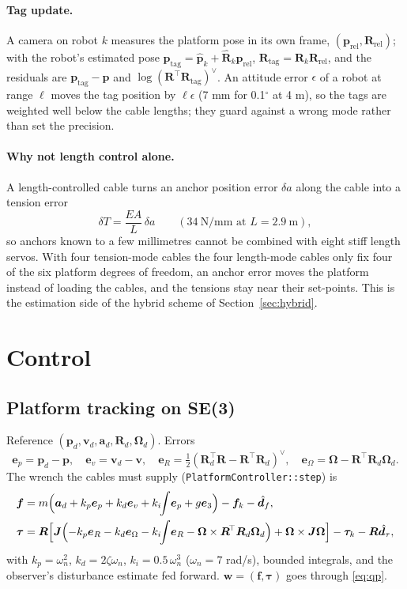 \documentclass[11pt,a4paper]{article}
\newcommand{\T}{^{\!\top}}
\newcommand{\e}{\bm{e}}
\begin{document}
\paragraph{Tag update.} A camera on robot $k$ measures the platform pose in its own frame,
$(\bm p_{\mathrm{rel}},\bm R_{\mathrm{rel}})$; with the robot's estimated pose
$\bm p_{\mathrm{tag}}=\hat{\bm p}_k+\hat{\bm R}_k\bm p_{\mathrm{rel}}$, $\bm R_{\mathrm{tag}}=\hat{\bm R}_k\bm R_{\mathrm{rel}}$, and the residuals are
$\bm p_{\mathrm{tag}}-\bm p$ and $\log(\bm R\T\bm R_{\mathrm{tag}})^\vee$. An attitude error $\epsilon$ of a robot at range $\ell$
moves the tag position by $\ell\epsilon$ (7 mm for 0.1$^\circ$ at 4 m), so the tags are weighted well below the
cable lengths; they guard against a wrong mode rather than set the precision.
\paragraph{Why not length control alone.} A length-controlled cable turns an anchor position error $\delta a$
along the cable into a tension error
\begin{equation} \delta T=\frac{EA}{L}\,\delta a\qquad(34\ \text{N/mm at }L=2.9\ \text{m}), \end{equation}
so anchors known to a few millimetres cannot be combined with eight stiff length servos. With four tension-mode
cables the four length-mode cables only fix four of the six platform degrees of freedom, an anchor error moves
the platform instead of loading the cables, and the tensions stay near their set-points. This is the estimation
side of the hybrid scheme of Section~\ref{sec:hybrid}.

\section{Control}
\subsection{Platform tracking on SE(3)}
Reference $(\bm p_d,\bm v_d,\bm a_d,\bm R_d,\bm\Omega_d)$. Errors
\begin{equation}
 \e_p=\bm p_d-\bm p,\quad \e_v=\bm v_d-\bm v,\quad \e_R=\tfrac12(\bm R_d\T\bm R-\bm R\T\bm R_d)^\vee,\quad \e_\Omega=\bm\Omega-\bm R\T\bm R_d\bm\Omega_d .
\end{equation}
The wrench the cables must supply (\texttt{PlatformController::step}) is
\begin{align}
 \bm f&=m\Bigl(\bm a_d+k_p\e_p+k_d\e_v+k_i\!\!\int\!\e_p+g\e_3\Bigr)-\bm f_k-\hat{\bm d}_f,\\
 \bm\tau&=\bm R\Bigl[\bm J\Bigl(-k_p\e_R-k_d\e_\Omega-k_i\!\!\int\!\e_R-\bm\Omega\times\bm R\T\bm R_d\bm\Omega_d\Bigr)+\bm\Omega\times\bm J\bm\Omega\Bigr]-\bm\tau_k-\bm R\hat{\bm d}_\tau,
\end{align}
with $k_p=\omega_n^2$, $k_d=2\zeta\omega_n$, $k_i=0.5\,\omega_n^3$ ($\omega_n=7$ rad/s), bounded integrals, and the
observer's disturbance estimate fed forward. $\bm w=(\bm f,\bm\tau)$ goes through \eqref{eq:qp}.
\end{document}
